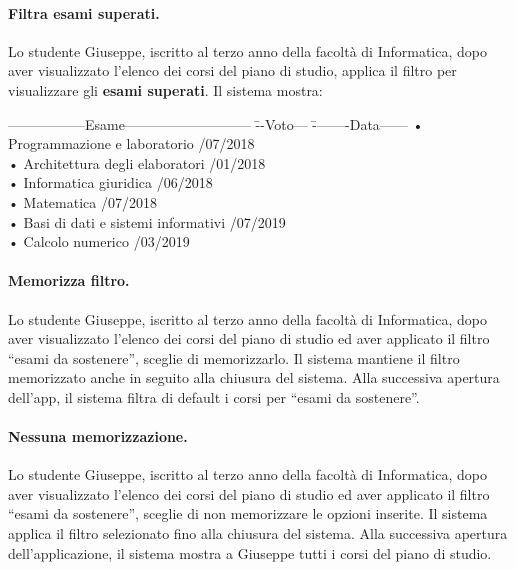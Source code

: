 \paragraph{Filtra esami superati.} 
Lo studente Giuseppe, iscritto al terzo anno della facoltà di Informatica, dopo aver visualizzato l’elenco dei corsi del piano di studio, applica il filtro per visualizzare gli\textbf{ esami superati}. Il sistema mostra:

\begin{tabbing}
	\hspace{1cm}-----------------Esame--------------------------- \= --Voto--- \= --------Data------ \kill
	\hspace{1cm} • Programmazione e laboratorio  /07/2018 \\
	\hspace{1cm} • Architettura degli elaboratori  /01/2018 \\
	\hspace{1cm} • Informatica giuridica  /06/2018 \\
	\hspace{1cm} • Matematica  /07/2018 \\
	\hspace{1cm} • Basi di dati e sistemi informativi  /07/2019 \\
	\hspace{1cm} • Calcolo numerico  /03/2019 \\
\end{tabbing}

\paragraph{Memorizza filtro.}
 Lo studente Giuseppe, iscritto al terzo anno della facoltà di Informatica, dopo aver visualizzato l’elenco dei corsi del piano di studio ed aver applicato il filtro “esami da sostenere”, sceglie di memorizzarlo. Il sistema mantiene il filtro memorizzato anche in seguito alla chiusura del sistema. Alla successiva apertura dell’app, il sistema filtra di default i corsi per “esami da sostenere”.
 
\paragraph{Nessuna memorizzazione.}Lo studente Giuseppe, iscritto al terzo anno della facoltà di Informatica, dopo aver visualizzato l’elenco dei corsi del piano di studio ed aver applicato il filtro “esami da sostenere”, sceglie di non memorizzare le opzioni inserite. Il sistema applica il filtro selezionato fino alla chiusura del sistema. Alla successiva apertura dell'applicazione, il sistema mostra a Giuseppe tutti i corsi del piano di studio.

